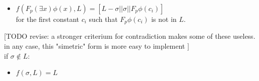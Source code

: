 {\begin{definition}
\begin{itemize}
            \item $f(F_{p} (\exists x) \phi(x), L) = [L - \sigma|| \sigma || F_{p} \phi(c_i) ]$\\ for the first constant $c_i$ such that $F_{p} \phi(c_i)$ is not in $L$.
        \end{itemize} [TODO revise: a stronger criterium for contradiction makes some of these useless. in any case, this "simetric" form is  more easy to implement ]\\
    if $\sigma \notin L$:
    \begin{itemize}
         \item $f(\sigma,L) = L $
    \end{itemize}
\end{definition}
}


\def\wellBehavedTheorem{
    \begin{theorem}
        Given a signed sentence list x, if x is intuitionistically valid then f(x) is intuitionistically valid 
    \end{theorem}
    \begin{proof}
        \cite{book1} proves this by using the definition of forcing. The choices of $p'$ and $c_i$ garantes the completnees of the tableaux.

        Case: if $L \ni F_{p} (\forall x) \phi(x) $ is intuitionistically valid, then there exists frame $\mathcal{C}$ that "respects" it. We take 
        a frame $\mathcal{C}'$ that is exactly like $\mathcal{C}$ with adition of a frame $p' \geq p$ such that $\mathcal{C}'(p') \nVdash \phi(c_i)$ for a new $c_i$. We now that 
        $\mathcal{C}'$ exists by the defintion of forcing for $\forall$. Also $\mathcal{C}'$ is a frame that "respects"
        $f(\forall x \phi(x), L) = [L - \sigma|| \sigma || T_{p} \phi(c_i) ]$
    \end{proof}
}

\def\TableauxDevelopmentDefinition{
    \begin{definition}
        \textbf{The Tableux Development of a Sentence } is defined inductivelly: 
        \begin{itemize}
            \item A tree with the single node $F_{\emptyset}\phi$ is a tableaux development of $\phi$. 
            \item If $\tau$ is a tableaux development of $\phi$, then $\hookleftarrow(\sigma,\tau)$ is a tableaux development of $\phi$. Where:
        \end{itemize}
    
        $\hookleftarrow(\sigma,\tau) = $ $\tau$ with $f(\sigma, l) $added to all leaves l that contain $\sigma$
    
    \end{definition}
}




